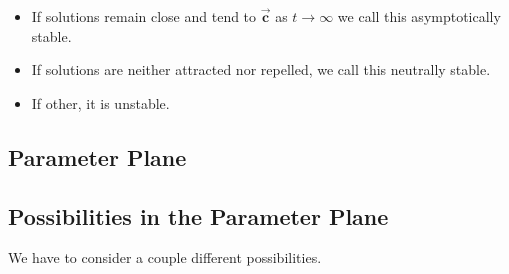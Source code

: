 \documentclass[12pt, landscape, twocolumn]{article}
\let\oldvec\vec
\renewcommand{\vec}[1]{\oldvec{\mathbf{ #1 } } }                    %
\begin{document}
        \begin{itemize}
            \item If solutions remain close and tend to $\vec{c}$ as $t \to \infty$ we call this asymptotically stable.
            \item If solutions are neither attracted nor repelled, we call this neutrally stable.
            \item If other, it is unstable.
        \end{itemize}

    \subsection{Parameter Plane}

    \subsection{Possibilities in the Parameter Plane}
    We have to consider a couple different possibilities.
\end{document}
